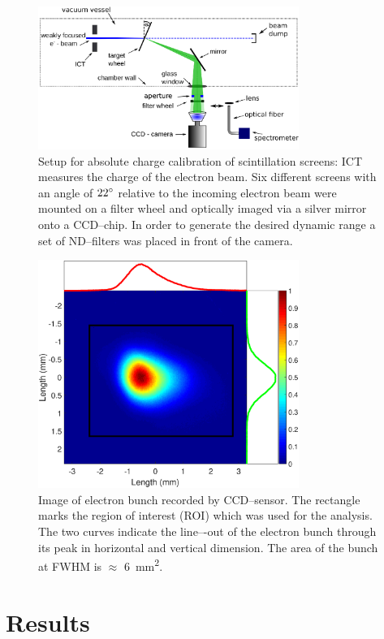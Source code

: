\documentclass[%
preprint,
amsmath,
amssymb,
aip,
rsi, 
numerical,
floatfix,
]{revtex4-1}
\begin{document}
\begin{figure}
\includegraphics[width=8.5cm]{./Figures/Setup_V3}%
\caption{\label{fig:Setup}Setup for absolute charge calibration of scintillation screens: ICT measures the charge of the electron beam. 
Six different screens with an angle of $22\degree$ relative to the incoming electron beam were mounted on a filter wheel and optically imaged via a silver mirror onto a CCD--chip.
In order to generate the desired dynamic range a set of ND--filters was placed in front of the camera.}
\end{figure}
\begin{figure}
\includegraphics[width=8.5cm]{./Figures/electron_bunch}%
\caption{\label{fig:electron_bunch}
Image of electron bunch recorded by CCD–sensor. 
The rectangle marks the region of interest (ROI) which was used for the analysis. 
The two curves indicate the line–-out of the electron bunch through its peak in
horizontal and vertical dimension. 
The area of the bunch at FWHM is $\approx$ \SI{6}{\square\milli\meter}.}
\end{figure}

\section{\label{Res} Results}
\end{document}
